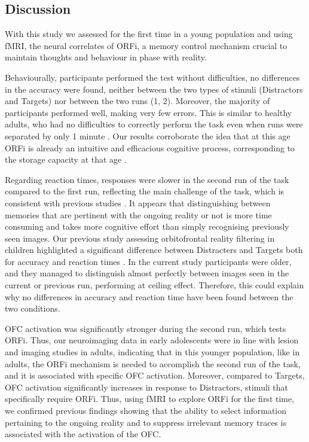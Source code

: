 \subsection{Discussion}
With this study we assessed for the first time in a young population and using fMRI, the neural correlates of ORFi, a memory control mechanism crucial to maintain thoughts and behaviour in phase with reality.

Behaviourally, participants performed the test without difficulties, no differences in the accuracy were found, neither between the two types of stimuli (Distractors and Targets) nor between the two runs (1, 2). Moreover, the majority of participants performed well, making very few errors. This is similar to healthy adults, who had no difficulties to correctly perform the task even when runs were separated by only 1 minute \citep{Schnider1999, Wahlen2011}. Our results corroborate the idea that at this age ORFi is already an intuitive and efficacious cognitive process, corresponding to the storage capacity at that age \citep{Liverani2017}. 

Regarding reaction times, responses were slower in the second run of the task compared to the first run, reflecting the main challenge of the task, which is consistent with previous studies \citep{Bouzerda-Wahlen2015, Liverani2016, Liverani2017}. It appears that distinguishing between memories that are pertinent with the ongoing reality or not is more time consuming and takes more cognitive effort than simply recognising previously seen images. Our previous study assessing orbitofrontal reality filtering in children highlighted a significant difference between Distracters and Targets both for accuracy and reaction times \citep{Liverani2017}. In the current study participants were older, and they managed to distinguish almost perfectly between images seen in the current or previous run, performing at ceiling effect. Therefore, this could explain why no differences in accuracy and reaction time have been found between the two conditions. 

OFC activation was significantly stronger during the second run, which tests ORFi. Thus, our neuroimaging data in early adolescents were in line with lesion and imaging studies in adults, indicating that in this younger population, like in adults, the ORFi mechanism is needed to accomplish the second run of the task, and it is associated with specific OFC activation. Moreover, compared to Targets, OFC activation significantly increases in response to Distractors, stimuli that specifically require ORFi. Thus, using fMRI to explore ORFi for the first time, we confirmed previous findings showing that the ability to select information pertaining to the ongoing reality and to suppress irrelevant memory traces is associated with the activation of the OFC. 

